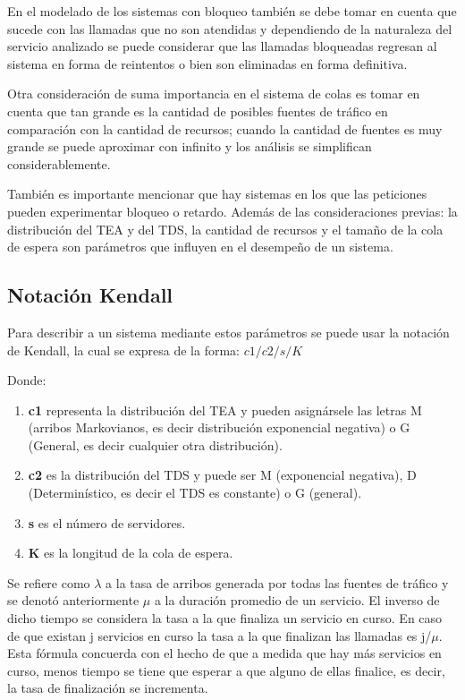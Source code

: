  En el modelado de los sistemas con bloqueo también se debe tomar en cuenta que sucede con las llamadas que no son atendidas y dependiendo de la naturaleza del servicio analizado se puede considerar que las llamadas bloqueadas regresan al sistema en forma de reintentos o bien son eliminadas en forma definitiva.\newline

 Otra consideración de suma importancia en el sistema de colas es tomar en cuenta que tan grande es la cantidad de posibles fuentes de tráfico en comparación con la cantidad de recursos; cuando la cantidad de fuentes es muy grande se puede aproximar con infinito y los análisis se simplifican considerablemente.\newline

 También es importante mencionar que hay sistemas en los que las peticiones pueden experimentar bloqueo o retardo. Además de las consideraciones previas: la distribución del TEA y del TDS, la cantidad de recursos y el tamaño de la cola de espera son parámetros que influyen en el desempeño de un sistema.\newline

 \subsection{Notación Kendall}

 Para describir a un sistema mediante estos parámetros se puede usar la notación de Kendall, la cual se expresa de la forma:
$c1/ c2/ s/ K$

 Donde:
\begin{enumerate}
\item  \textbf{c1} representa la distribución del TEA y pueden asignársele las letras M (arribos Markovianos, es decir distribución exponencial negativa) o G (General, es decir cualquier otra distribución).
\item  \textbf{c2} es la distribución del TDS y puede ser M (exponencial negativa), D (Determinístico, es decir el TDS es constante) o G (general).
\item  \textbf{s} es el número de servidores.
\item  \textbf{K} es la longitud de la cola de espera.
\end{enumerate}

 Se refiere como $\lambda$ a la tasa de arribos generada por todas las fuentes de tráfico y se denotó anteriormente $\mu$ a la duración promedio de un servicio. El inverso de dicho tiempo se considera la tasa a la que finaliza un servicio en curso. En caso de que existan j servicios en curso la tasa a la que finalizan las llamadas es j/$\mu$. Esta fórmula concuerda con el hecho de que a medida que hay más servicios en curso, menos tiempo se tiene que esperar a que alguno de ellas finalice, es decir, la tasa de finalización se incrementa.

